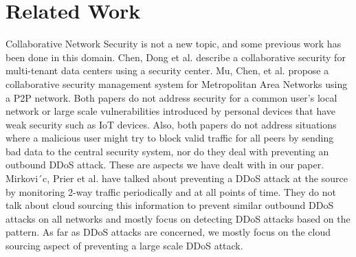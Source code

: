 \section{Related Work}
\label{sec:related}

Collaborative Network Security is not a new topic, and some previous work has been done in this domain. Chen,  Dong et al. \cite {collaborative} describe a collaborative security for multi-tenant data centers using a security center. Mu, Chen, et al. \cite {metro} propose a collaborative security management system for Metropolitan Area Networks using a P2P network. Both papers do not address security for a common user's local network or large scale vulnerabilities introduced by personal devices that have weak security such as IoT devices. Also, both papers do not address situations where a malicious user might try to block valid traffic for all peers by sending bad data to the central security system, nor do they deal with preventing an outbound DDoS attack. These are aspects we have dealt with in our paper. Mirkovi´c, Prier et al. \cite{attackddos} have talked about preventing a DDoS attack at the source by monitoring 2-way traffic periodically and at all points of time. They do not talk about cloud sourcing this information to prevent similar outbound DDoS attacks on all networks and mostly focus on detecting DDoS attacks based on the pattern. As far as DDoS attacks are concerned, we mostly focus on the cloud sourcing aspect of preventing a large scale DDoS attack.